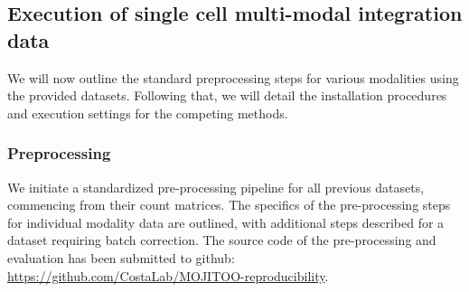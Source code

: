 \subsection{Execution of single cell multi-modal integration data}
\label{MOJITOO:exp:run}
We will now outline the standard preprocessing steps for various modalities using the provided datasets. Following that, we will detail the installation procedures and execution settings for the competing methods.

\subsubsection{Preprocessing}
\label{MOJITOO:exp:preprocessing}
We initiate a standardized pre-processing pipeline for all previous datasets, commencing from their count matrices. The specifics of the pre-processing steps for individual modality data are outlined, with additional steps described for a dataset requiring batch correction. The source code of the pre-processing and evaluation has been submitted to github: \url{https://github.com/CostaLab/MOJITOO-reproducibility}.
